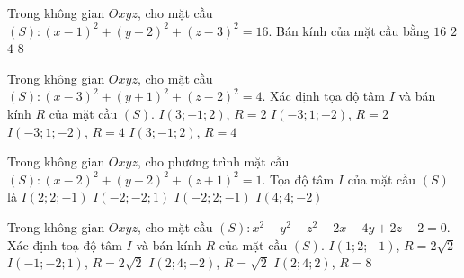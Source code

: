 

\begin{ex}%
	Trong không gian $Oxyz$, cho  mặt cầu $(S)\colon(x-1)^2+(y-2)^2+(z-3)^2=16$. Bán kính của mặt cầu bằng
	\choice 
		 {$16$}
		 {$2$}
		 {\True $4$}
		{$8$} 
\end{ex}

\begin{ex}%
	Trong không gian $Oxyz$, cho mặt cầu $(S)\colon  (x-3)^2+(y+1)^2+(z-2)^2=4$. Xác định tọa độ tâm $I$ và bán kính $R$ của mặt cầu $(S)$.
	 \choice
		{\True $I(3;-1;2)$, $R=2$} 
		{$I(-3;1;-2)$,  $R=2$}
		{$I(-3;1;-2)$,  $R=4$}
		{$I(3;-1;2)$, $R=4$} 
\end{ex}

\begin{ex}%
	Trong  không gian $Oxyz$, cho phương trình mặt cầu $(S)\colon (x-2)^2+(y-2)^2+(z+1)^2=1$. Tọa độ tâm $I$ của mặt cầu $(S)$ là
	 \choice
		 {\True $I(2;2;-1)$}
		 {$I(-2;-2;1)$}
		{$I(-2;2;-1)$} 
		{$I(4;4;-2)$} 
\end{ex}

\begin{ex}%
	 Trong không gian $Oxyz$, cho mặt cầu $(S)\colon x^2+y^2+z^2-2x-4y+2z-2=0$. Xác định toạ độ tâm $I$ và bán kính $R$ của mặt cầu $(S)$.
	 \choice
		{\True  $I(1;2;-1)$, $R=2 \sqrt{2}$}
		{$I(-1;-2;1)$,  $R=2 \sqrt{2}$}
		 {$I(2;4;-2)$, $R=\sqrt{2}$}
		 {$I(2;4;2)$, $R=8$}
\end{ex}

